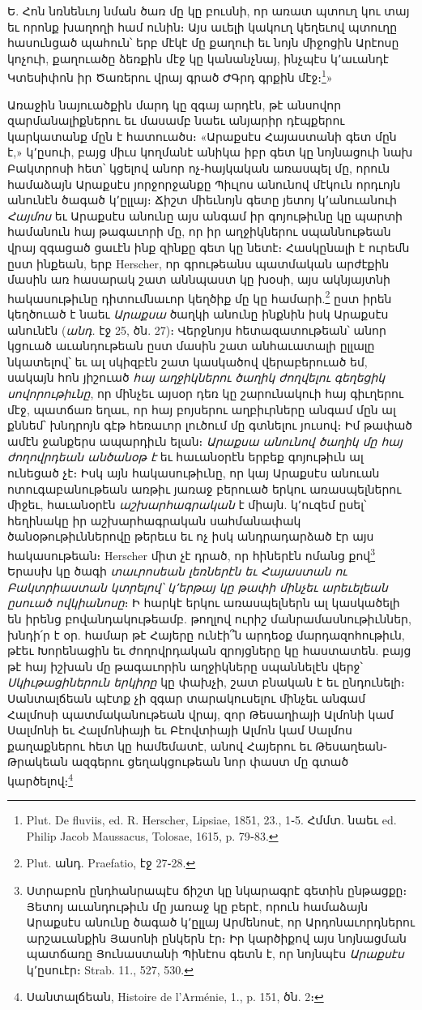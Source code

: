 \documentclass{article}
\begin{document}
{Ե. Հոն նռնենւոյ նման ծառ մը կը բուսնի, որ առատ պտուղ կու տայ եւ որոնք խաղողի համ ունին։ Այս աւելի կակուղ կեղեւով պտուղը հասունցած պահուն՝ երբ մէկէ մը քաղուի եւ նոյն միջոցին Արէոսը կոչուի, քաղուածը ձեռքին մէջ կը կանանչնայ, ինչպէս կ՚աւանդէ Կտեսիփոն իր Ծառերու վրայ գրած ԺԳրդ գրքին մէջ։\footnote{Plut. De fluviis, ed. R. Herscher, Lipsiae, 1851, 23., 1֊5. Հմմտ. նաեւ ed. Philip Jacob Maussacus, Tolosae, 1615, p. 79֊83.}»

Առաջին նայուածքին մարդ կը զգայ արդէն, թէ անսովոր զարմանալիքներու եւ մասամբ նաեւ անյարիր դէպքերու կարկատանք մըն է հատուածս։ «Արաքսէս Հայաստանի գետ մըն է,» կ՚ըսուի, բայց միւս կողմանէ անիկա իբր գետ կը նոյնացուի նախ Բակտրոսի հետ՝ կցելով անոր ոչ֊հայկական առասպել մը, որուն համաձայն Արաքսէս յորջորջանքը Պիւլոս անունով մէկուն որդւոյն անունէն ծագած կ՚ըլլայ։ Ճիշտ միեւնոյն գետը յետոյ կ՚անուանուի \emph{Հայմոս} եւ Արաքսէս անունը այս անգամ իր գոյութիւնը կը պարտի համանուն հայ թագաւորի մը, որ իր աղջիկներու սպաննութեան վրայ զգացած ցաւէն ինք զինքը գետ կը նետէ։ Հասկընալի է ուրեմն ըստ ինքեան, երբ Herscher, որ գրութեանս պատմական արժէքին մասին առ հասարակ շատ աննպաստ կը խօսի, այս ակնյայտնի հակասութիւնը դիտումնաւոր կեղծիք մը կը համարի.\footnote{Plut. անդ. Praefatio, էջ 27֊28.} ըստ իրեն կեղծուած է նաեւ \emph{Արաքսա} ծաղկի անունը ինքնին իսկ Արաքսէս անունէն (\emph{անդ.} էջ 25, ծն. 27)։ Վերջնոյս հետազատութեան՝ անոր կցուած աւանդութեան ըստ մասին շատ անհաւատալի ըլլալը նկատելով՝ եւ ալ սկիզբէն շատ կասկածով վերաբերուած եմ, սակայն հոն յիշուած \emph{հայ աղջիկներու ծաղիկ ժողվելու գեղեցիկ սովորութիւնը}, որ մինչեւ այսօր դեռ կը շարունակուի հայ գիւղերու մէջ, պատճառ եղաւ, որ հայ բոյսերու աղբիւրները անգամ մըն ալ քննեմ՝ խնդրոյն գէթ հեռաւոր լուծում մը գտնելու յուսով։ Իմ թափած ամէն ջանքերս ապարդիւն ելան։ \emph{Արաքսա անունով ծաղիկ մը հայ ժողովրդեան անծանօթ է} եւ հաւանօրէն երբեք գոյութիւն ալ ունեցած չէ։ Իսկ այն հակասութիւնը, որ կայ Արաքսէս անուան ոտուգաբանութեան առթիւ յառաջ բերուած երկու առասպելներու միջեւ, հաւանօրէն \emph{աշխարհագրական} է միայն. կ՚ուզեմ ըսել՝ հեղինակը իր աշխարհագրական սահմանափակ ծանօթութիւններովը թերեւս եւ ոչ իսկ անդրադարձած էր այս հակասութեան։ Herscher միտ չէ դրած, որ հիներէն ոմանց քով\footnote{Ստրաբոն ընդհանրապէս ճիշտ կը նկարագրէ գետին ընթացքը։ Յետոյ աւանդութիւն մը յառաջ կը բերէ, որուն համաձայն Արաքսէս անունը ծագած կ՚ըլլայ Արմենոսէ, որ Արդոնաւորդներու արշաւանքին Յասոնի ընկերն էր։ Իր կարծիքով այս նոյնացման պատճառը Յունաստանի Պինէոս գետն է, որ նոյնպէս \emph{Արաքսէս} կ՚ըսուէր։ Strab. 11., 527, 530.} Երասխ կը ծագի \emph{տաւրոսեան լեռներէն եւ Հայաստան ու Բակտրիաստան կտրելով՝ կ՚երթայ կը թափի մինչեւ արեւելեան ըսուած ովկիանոսը}։ Ի հարկէ երկու առասպելներն ալ կասկածելի են իրենց բովանդակութեամբ. թողլով ուրիշ մանրամասնութիւններ, խնդի՛ր է օր. համար թէ Հայերը ունէի՞ն արդեօք մարդազոհութիւն, թէեւ Խորենացին եւ ժողովրդական զրոյցները կը հաստատեն. բայց թէ հայ իշխան մը թագաւորին աղջիկները սպաննելէն վերջ՝ \emph{Սկիւթացիներուն երկիրը} կը փախչի, շատ բնական է եւ ընդունելի։ Սանտալճեան պէտք չի զգար տարակուսելու մինչեւ անգամ Հալմոսի պատմականութեան վրայ, զոր Թեսաղիայի Ալմոնի կամ Սալմոնի եւ Հալմոնիայի եւ Բէովտիայի Ալմոն կամ Սալմոս քաղաքներու հետ կը համեմատէ, անով Հայերու եւ Թեսաղեան֊Թրակեան ազգերու ցեղակցութեան նոր փաստ մը գտած կարծելով։\footnote{Սանտալճեան, Histoire de l'Arménie, 1., p. 151, ծն. 2։}

}
\end{document}
